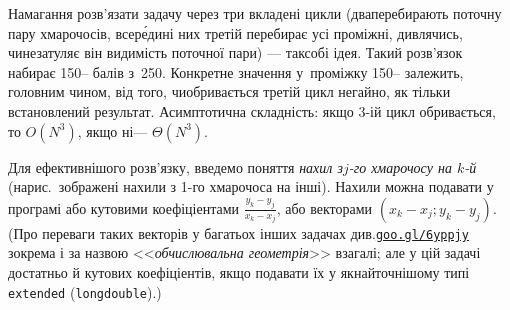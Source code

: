 \Tutorial	Намагання розв'язати задачу через три вкладені цикли (два\nolinebreak[3] перебирають поточну пару хмарочосів, всер\'{е}дині них третій перебирає усі проміжні, дивлячись, чи\nolinebreak[2] не\nolinebreak[3] затуляє він видимість поточної пари) --- так\nolinebreak[3] собі ідея. Такий розв’язок набирає 150-- балів з~250. Конкретне значення у~проміжку 150-- залежить, головним чином, від того, чи\nolinebreak[3] обривається третій цикл негайно, як тільки встановлений результат. Асимптотична складність: якщо \mbox{3-ій} цикл обривається, то $O(N^3)$, якщо ні\nolinebreak[3] --- $\Theta(N^3)$. 

Для ефективнішого розв'язку, введемо поняття \emph{нахил з\nolinebreak[3] \mbox{$j$-го} хмарочосу на \mbox{$k$-й}} (на\nolinebreak[2] рис.\ зображені нахили з \mbox{1-го} хмарочоса на інші). Нахили можна подавати у програмі або кутовими коефіціентами
$\displaystyle\frac{y_k-y_j}{x_k-x_j}$,
або векторами $({x_k{-}x_j}; {y_k{-}y_j})$.
(Про переваги %
таких векторів у багатьох інших задачах
див.\nolinebreak[1] \href{https://goo.gl/6yppjy}{\texttt{\mbox{goo.gl/}\nolinebreak[2]\mbox{6yppjy}}} зокрема і за назвою <<\emph{обчислювальна геометрія}>> взагалі; але у цій задачі достатньо й кутових коефіціентів, якщо подавати їх у якнайточнішому типі \verb"extended" (\texttt{long\nolinebreak[3] double}).)

